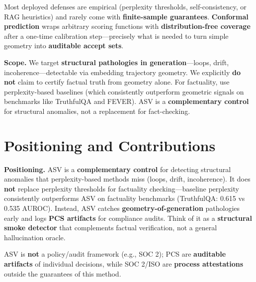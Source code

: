\documentclass[10pt]{article}
\begin{document}
Most deployed defenses are empirical (perplexity thresholds, self-consistency, or RAG heuristics) and rarely come with \textbf{finite-sample guarantees}. \textbf{Conformal prediction} wraps arbitrary scoring functions with \textbf{distribution-free coverage} after a one-time calibration step---precisely what is needed to turn simple geometry into \textbf{auditable accept sets}.

\textbf{Scope.} We target \textbf{structural pathologies in generation}---loops, drift, incoherence---detectable via embedding trajectory geometry. We explicitly \textbf{do not} claim to certify factual truth from geometry alone. For factuality, use perplexity-based baselines (which consistently outperform geometric signals on benchmarks like TruthfulQA and FEVER). ASV is a \textbf{complementary control} for structural anomalies, not a replacement for fact-checking.

\section{Positioning and Contributions}
\label{sec:contributions}

\textbf{Positioning.} ASV is a \textbf{complementary control} for detecting structural anomalies that perplexity-based methods miss (loops, drift, incoherence). It does \textbf{not} replace perplexity thresholds for factuality checking---baseline perplexity consistently outperforms ASV on factuality benchmarks (TruthfulQA: 0.615 vs 0.535 AUROC). Instead, ASV catches \textbf{geometry-of-generation} pathologies early and logs \textbf{PCS artifacts} for compliance audits. Think of it as a \textbf{structural smoke detector} that complements factual verification, not a general hallucination oracle.

ASV is \textbf{not} a policy/audit framework (e.g., SOC 2); PCS are \textbf{auditable artifacts} of individual decisions, while SOC 2/ISO are \textbf{process attestations} outside the guarantees of this method.
\end{document}
